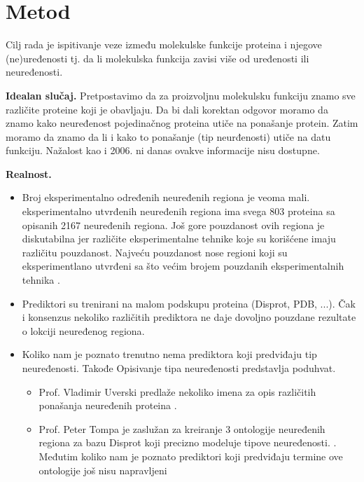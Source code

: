 \section {Metod}

Cilj rada je ispitivanje veze između molekulske funkcije proteina i njegove
(ne)uređenosti tj. da li molekulska funkcija zavisi više od uređenosti ili
neuređenosti.

\textbf{Idealan slučaj.} 
Pretpostavimo da za proizvoljnu molekulsku funkciju znamo sve različite
proteine koji je obavljaju.  Da bi dali korektan odgovor  moramo da znamo kako
neuređenost pojedinačnog proteina utiče na ponašanje protein.  Zatim moramo da
znamo da li i kako to ponašanje (tip neurđenosti) utiče na datu funkciju.
Nažalost kao i 2006. ni danas ovakve informacije nisu dostupne.

\textbf{Realnost.} 
\begin{itemize}
  \item Broj eksperimentalno određenih neuređenih regiona je veoma mali.
     eksperimentalno utvrđenih neuređenih regiona ima
    svega 803 proteina sa opisanih 2167 neuređenih regiona. Još gore pouzdanost
    ovih regiona je diskutabilna jer različite eksperimentalne tehnike koje su
    korišćene imaju različitu pouzdanost. Najveću pouzdanost nose regioni koji
    su eksperimentlano utvrđeni sa što većim brojem pouzdanih eksperimentalnih
    tehnika \parencite{disprot}. 
  \item Prediktori su trenirani na malom podskupu proteina (Disprot, PDB, ...).
    Čak i konsenzus nekoliko različitih prediktora ne daje dovoljno pouzdane
    rezultate o lokciji neuređenog regiona\parencite{Mitic}.
  \item Koliko nam je poznato trenutno nema prediktora koji predviđaju tip
    neuređenosti. Takođe Opisivanje tipa neuređenosti predstavlja poduhvat.
    \begin{itemize}
      \item Prof. Vladimir Uverski predlaže nekoliko imena za opis različitih
        ponašanja neuređenih proteina 
        \parencite{Uversky2017}.
      \item Prof. Peter Tompa je zaslužan za kreiranje 3 ontologije neuređenih
        regiona za bazu Disprot koji precizno modeluje tipove
        neuređenosti\parencite{disprot}.  .  Međutim koliko nam je poznato
        prediktori koji predviđaju termine ove ontologije još nisu napravljeni
    \end{itemize}

\end{itemize}

